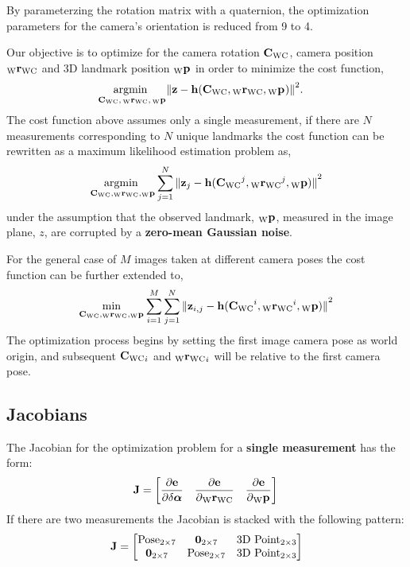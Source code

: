 By parameterzing the rotation matrix with a quaternion, the optimization
parameters for the camera's orientation is reduced from 9 to 4.

Our objective is to optimize for the camera rotation $\camRot$, camera
position $\camPos$ and 3D landmark position $\Pt{\world}$ in order to
minimize the cost function,
%
\begin{align}
  &\Argmin{\camRot, \, \camPos, \, \Pt{\world}} \Norm{
    \measurement - \projFunc(\camRot, \camPos, \Pt{\world})
  }^{2} .
\end{align}
%
The cost function above assumes only a single measurement, if there are $N$
measurements corresponding to $N$ unique landmarks the cost function can be
rewritten as a maximum likelihood estimation problem as,
%
\begin{equation}
  \Argmin{\camRot, \camPos, \Pt{\world}}
  \sum_{j = 1}^{N}
  \Norm{
    \measurement_{j} - \projFunc(\camRot^{j}, \camPos^{j}, \Point{\world}{j})
  }^{2}
\end{equation}
%
under the assumption that the observed landmark, $\Pt{\world}$, measured in
the image plane, $z$, are corrupted by a \textbf{zero-mean Gaussian noise}.

For the general case of $M$ images taken at different camera poses the cost
function can be further extended to,
%
\begin{equation}
  \min_{\camRot, \camPos, \Pt{\world}}
  \sum_{i = 1}^{M} \sum_{j = 1}^{N}
  \Norm{
    \measurement_{i, j}
    - \projFunc(\camRot^{i}, \camPos^{i}, \Point{\world}{j})
  }^{2}
\end{equation}
%
The optimization process begins by setting the first image camera pose as world
origin, and subsequent $\camRot_{i}$ and $\camPos_{i}$ will be relative to the
first camera pose.


\subsection*{Jacobians}

The Jacobian for the optimization problem for a \textbf{single measurement} has
the form:
%
\begin{equation}
  \jac = \begin{bmatrix}
    \dfrac{\partial{\errFunc}}{\partial \delta \boldsymbol{\alpha}} \quad
    \dfrac{\partial{\errFunc}}{\partial \camPos} \quad
    \dfrac{\partial{\errFunc}}{\partial \Pt{\world}}
  \end{bmatrix} \\
\end{equation}
%
If there are two measurements the Jacobian is stacked with the following
pattern:
%
\begin{equation}
  \jac = \begin{bmatrix}
    \text{Pose}_{2 \times 7}
      & \Zeros{2}{7}
      & \text{3D Point}_{2 \times 3} \\
    \Zeros{2}{7}
      & \text{Pose}_{2 \times 7}
      & \text{3D Point}_{2 \times 3}
  \end{bmatrix}
\end{equation}

